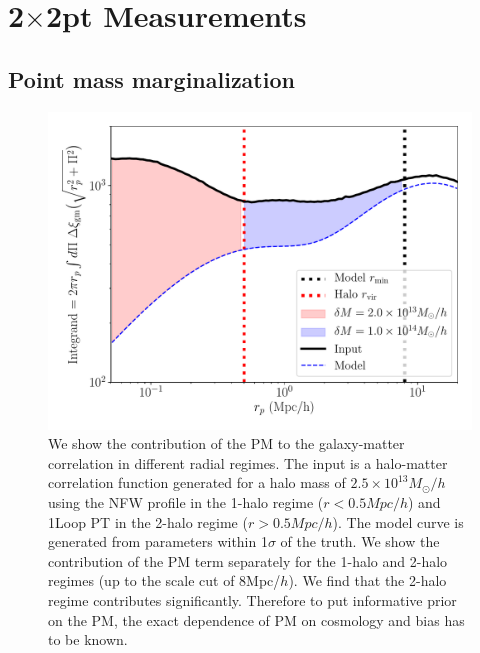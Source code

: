 \documentclass[fleqn,usenatbib]{mnras}
\begin{document}


\appendix

\section{2$\times$2pt Measurements}\label{app:2x2pt_measure}

\subsection{Point mass marginalization}
\begin{figure}
\includegraphics[width=\columnwidth]{figs/PM_contribution_radial.pdf}
\caption[]{We show the contribution of the PM to the galaxy-matter correlation in different radial regimes. The input is a halo-matter correlation function generated for a halo mass of $2.5 \times 10^{13} M_{\odot}/h$ using the NFW profile in the 1-halo regime ($r < 0.5 Mpc/h$) and 1Loop PT in the 2-halo regime ($r > 0.5 Mpc/h$). The model curve is generated from parameters within 1$\sigma$ of the truth. We show the contribution of the PM term separately for the 1-halo  and 2-halo regimes (up to the scale cut of 8Mpc/$h$). We find that the 2-halo regime contributes significantly. Therefore to put informative prior on the PM, the exact dependence of PM on cosmology and bias has to be known. 
}
\label{fig:pm_prior}
\end{figure}
\end{document}
